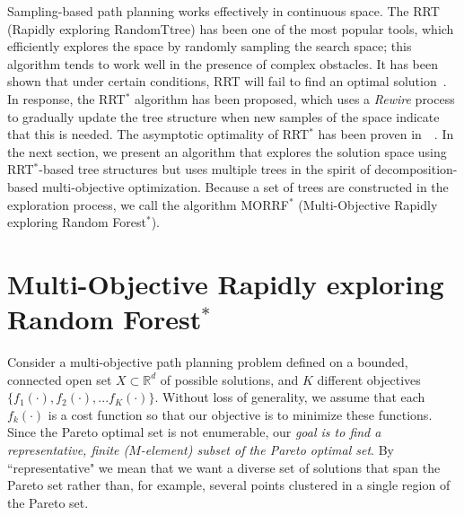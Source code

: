 \documentclass[conference]{IEEEtran}
\begin{document}
Sampling-based path planning works effectively in continuous space. 
The RRT (Rapidly exploring RandomTtree) has been one of the most popular tools, which  efficiently explores the space by randomly sampling the search space; this algorithm tends to work well in the presence of complex obstacles.
It has been shown that under certain conditions, RRT will fail to find an optimal solution~\cite{Karaman.Frazzoli:RSS10}. 
In response, the RRT$^{*}$ algorithm has been proposed, which uses a \emph{Rewire} process to gradually update the tree structure when new samples of the space indicate that this is needed.
The asymptotic optimality of RRT$^{*}$ has been proven in~\cite{Karaman.Frazzoli:RSS10}~\cite{Karaman:2011:SAO:2000201.2000209}. 
In the next section, we present an algorithm that explores the solution space using RRT$^{*}$-based tree structures but uses multiple trees in the spirit of decomposition-based multi-objective optimization.
Because a set of trees are constructed in the exploration process, we call the algorithm MORRF$^{*}$ (Multi-Objective Rapidly exploring Random Forest$^{*}$).


\section{Multi-Objective Rapidly exploring Random Forest$^{*}$}
\label{sec:morrt}

Consider a multi-objective path planning problem defined on a bounded, connected open set $X\subset\mathbb{R}^d$ of possible solutions, and $K$ different objectives $\{f_1(\cdot), f_2(\cdot), ... f_{K}(\cdot)\}$. 
Without loss of generality, we assume that each $f_k(\cdot)$ is a cost function so that our objective is to minimize these functions.  
Since the Pareto optimal set is not enumerable, our {\em goal is to find a representative, finite ($M$-element) subset of the Pareto optimal set}.  
By ``representative" we mean that we want a diverse set of solutions that span the Pareto set rather than, for example, several points clustered in a single region of the Pareto set.  
\end{document}
